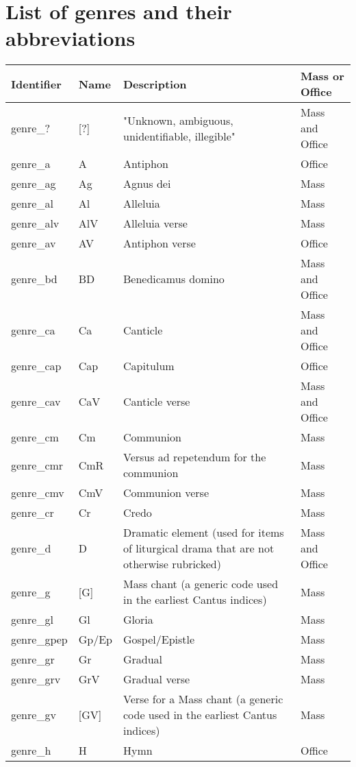\chapter{List of genres and their abbreviations}
\label{attachment:genres}

\begin{longtable}{| p{} | p{} | p{} | p{} |} 

\hline
Identifier & Name & Description & Mass or Office \\
\hline
genre\_? & [?] & "Unknown, ambiguous, unidentifiable, illegible" & Mass and Office \\
genre\_a & A & Antiphon & Office \\
genre\_ag & Ag & Agnus dei & Mass \\
genre\_al & Al & Alleluia & Mass \\ 
genre\_alv & AlV & Alleluia verse & Mass \\
genre\_av & AV & Antiphon verse & Office \\
genre\_bd & BD & Benedicamus domino & Mass and Office \\
genre\_ca & Ca & Canticle & Mass and Office \\
genre\_cap & Cap & Capitulum & Office \\
genre\_cav & CaV & Canticle verse & Mass and Office \\
genre\_cm & Cm & Communion & Mass \\
genre\_cmr & CmR & Versus ad repetendum for the communion & Mass \\
genre\_cmv & CmV & Communion verse & Mass \\
genre\_cr & Cr & Credo & Mass \\
genre\_d & D & Dramatic element (used for items of liturgical drama that are not otherwise rubricked) & Mass and Office \\
genre\_g & [G] & Mass chant (a generic code used in the earliest Cantus indices) & Mass \\
genre\_gl & Gl & Gloria & Mass \\
genre\_gpep & Gp/Ep & Gospel/Epistle & Mass \\
genre\_gr & Gr & Gradual & Mass \\
genre\_grv & GrV & Gradual verse & Mass \\
genre\_gv & [GV] & Verse for a Mass chant (a generic code used in the earliest Cantus indices) & Mass \\
genre\_h & H & Hymn & Office \\

\end{longtable}
